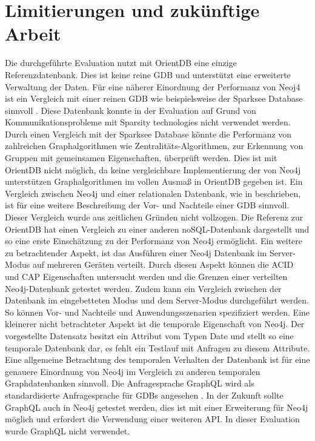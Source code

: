 \section{Limitierungen und zukünftige Arbeit}
Die durchgeführte Evaluation nutzt mit OrientDB  eine einzige Referenzdatenbank. Dies ist keine reine GDB und unterstützt eine erweiterte Verwaltung der Daten. Für eine näherer Einordnung der Performanz von Neoj4 ist ein Vergleich mit einer reinen GDB wie beispielsweise der Sparksee Database sinnvoll \parencite{Sparksee}. Diese Datenbank konnte in der Evaluation auf Grund von Kommunikationsprobleme mit Sparsity technologies nicht verwendet werden. Durch einen Vergleich mit der Sparksee Database könnte die Performanz von zahlreichen Graphalgorithmen  wie Zentralitäts-Algorithmen, zur Erkennung von Gruppen mit gemeinsamen Eigenschaften, überprüft werden. Dies ist mit OrientDB nicht möglich, da keine vergleichbare Implementierung der von Neo4j unterstützen Graphalgorithmen im vollen Ausmaß in OrientDB gegeben ist. \newline 
Ein Vergleich zwischen Neo4j und einer relationalen Datenbank, wie in \parencite{vicknair2010comparison} beschrieben, ist für eine weitere Beschreibung der Vor- und Nachteile einer GDB sinnvoll. Dieser Vergleich wurde aus zeitlichen Gründen nicht vollzogen. Die Referenz zur OrientDB hat einen Vergleich zu einer anderen noSQL-Datenbank dargestellt und so eine erste Einschätzung zu der Performanz von Neo4j ermöglicht. \newline
Ein weitere zu betrachtender Aspekt, ist das Ausführen einer Neo4j Datenbank im Server-Modus auf mehreren Geräten verteilt. Durch diesen Aspekt können die ACID und CAP Eigenschaften untersucht werden und die Grenzen einer verteilten Neo4j-Datenbank getestet werden. Zudem kann ein Vergleich zwischen der Datenbank im eingebetteten Modus und dem Server-Modus durchgeführt werden. So können Vor- und Nachteile und  Anwendungsszenarien spezifiziert werden. \newline
Eine kleinerer nicht betrachteter Aspekt ist die temporale Eigenschaft von Neo4j. Der vorgestellte Datensatz besitzt ein Attribut vom Typen Date und stellt so eine temporale Datenbank dar, es fehlt ein Testlauf mit Anfragen zu diesem Attribute. Eine allgemeine Betrachtung des temporalen Verhalten der Datenbank ist für eine genauere Einordnung von Neo4j im Vergleich zu anderen temporalen Graphdatenbanken sinnvoll.   \newline
Die Anfragesprache GraphQL wird als standardisierte Anfragesprache für GDBs angesehen \parencite{GraphQL}. In der Zukunft sollte GraphQL auch in Neo4j getestet werden, dies ist mit einer Erweiterung für Neo4j möglich und erfordert die Verwendung einer weiteren API. In dieser Evaluation wurde GraphQL nicht verwendet. 
